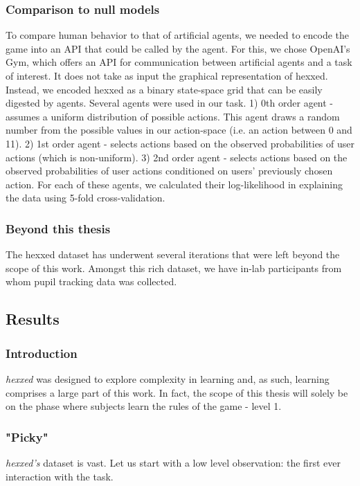 \documentclass[11pt]{article}
\begin{document}
\subsubsection{Comparison to null models}
To compare human behavior to that of artificial agents, we needed to encode the game into an API that could be called by the agent. For this, we chose OpenAI’s Gym, which offers an API for communication between artificial agents and a task of interest. It does not take as input the graphical representation of hexxed. Instead, we encoded hexxed as a binary state-space grid that can be easily digested by agents. Several agents were used in our task.
    1) 0th order agent - assumes a uniform distribution of possible actions. This agent draws a random number from the possible values in our action-space (i.e. an action between 0 and 11).
    2)  1st order agent - selects actions based on the observed probabilities of user actions (which is non-uniform).
    3) 2nd order agent - selects actions based on the observed probabilities of user actions conditioned on users’ previously chosen action.
For each of these agents, we calculated their log-likelihood in explaining the data using 5-fold cross-validation.

%
%

\subsubsection{Beyond this thesis}
The hexxed dataset has underwent several iterations that were left beyond the scope of this work. Amongst this rich dataset, we have in-lab participants from whom pupil tracking data was collected.

\subsection{Results}

\subsubsection{Introduction}
\textit{hexxed} was designed to explore complexity in learning and, as such, learning comprises a large part of this work. In fact, the scope of this thesis will solely be on the phase where subjects learn the rules of the game - level 1.


\FloatBarrier
\subsubsection{"Picky"}\label{picky}
\textit{hexxed's} dataset is vast. Let us start with a low level observation: the first ever interaction with the task.
\end{document}
